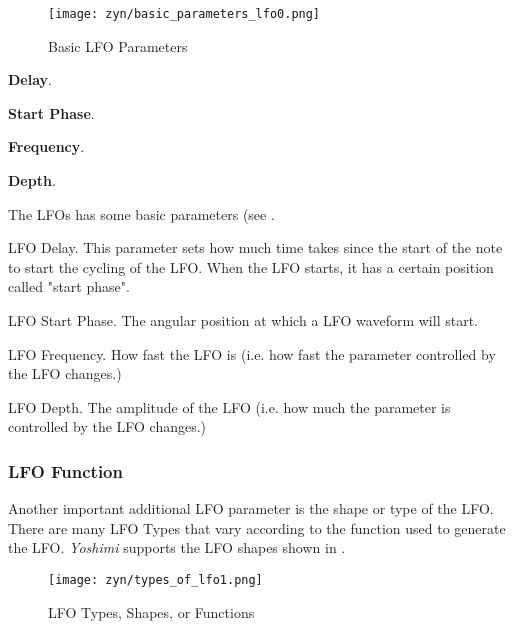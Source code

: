 \begin{figure}[H]
   \centering 
   \texttt{[image: zyn/basic\_parameters\_lfo0.png]}
   \caption[Basic LFO Parameters]{Basic LFO Parameters}
   \label{fig:basic_parameters_lfo} 
\end{figure}

   \begin{enumber}
      \item \textbf{Delay}.
      \item \textbf{Start Phase}.
      \item \textbf{Frequency}.
      \item \textbf{Depth}.
   \end{enumber}

   The LFOs has some basic parameters (see
   .

   \setcounter{ItemCounter}{0}      %

   LFO Delay.
   This parameter sets how much time takes since the start of the note to
   start the cycling of the LFO.
   When the LFO starts, it has a certain position called "start phase".

   LFO Start Phase.
   The angular position at which a LFO waveform will start.

   LFO Frequency.
   How fast the LFO is (i.e. how fast the parameter controlled by
   the LFO changes.)

   LFO Depth.
   The amplitude of the LFO (i.e. how much the parameter is controlled by
   the LFO changes.)

\subsubsection{LFO Function}
\label{subsubsec:lfo_function}

   Another important additional LFO parameter is the shape or type of the
   LFO. There are many LFO Types that vary according to the function used to
   generate the LFO. \textsl{Yoshimi} supports the LFO shapes shown in
   .

\begin{figure}[H]
   \centering 
   \texttt{[image: zyn/types\_of\_lfo1.png]}
   \caption[LFO Functions]{LFO Types, Shapes, or Functions}
   \label{fig:types_of_lfo}
\end{figure}

